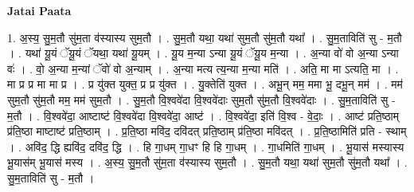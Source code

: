 \documentclass[17pt]{extarticle}
\begin{document}
\textbf{Jatai Paata} \newline

1. अ॒स्य॒ सु॒म॒तौ सु॑म॒ता व॑स्यास्य सुम॒तौ । . सु॒म॒तौ यथा॒ यथा॑ सुम॒तौ सु॑म॒तौ यथा᳚ । . सु॒म॒ताविति॑ सु - म॒तौ । . यथा॑ यू॒यं ॅयू॒यं ॅयथा॒ यथा॑ यू॒यम् । . यू॒य म॒न्या ऽन्या यू॒यं ॅयू॒य म॒न्या । . अ॒न्या वो॑ वो अ॒न्या ऽन्या वः॑ । . वो॒ अ॒न्या म॒न्यां ॅवो॑ वो अ॒न्याम् । . अ॒न्या मत्य त्य॒न्या म॒न्या मति॑ । . अति॒ मा मा ऽत्यति॒ मा । . मा प्र प्र मा मा प्र । . प्र यु॑क्त युक्त॒ प्र प्र यु॑क्त । . यु॒क्तेति॑ युक्त । . अभू॒न् मम॒ ममा भू॒ दभू॒न् मम॑ । . मम॑ सुम॒तौ सु॑म॒तौ मम॒ मम॑ सुम॒तौ । . सु॒म॒तौ वि॒श्ववे॑दा वि॒श्ववे॑दाः सुम॒तौ सु॑म॒तौ वि॒श्ववे॑दाः । . सु॒म॒ताविति॑ सु - म॒तौ । . वि॒श्ववे॑दा॒ आष्टाष्ट॑ वि॒श्ववे॑दा वि॒श्ववे॑दा॒ आष्ट॑ । . वि॒श्ववे॑दा॒ इति॑ वि॒श्व - वे॒दाः॒ । . आष्ट॑ प्रति॒ष्ठाम् प्र॑ति॒ष्ठा माष्टाष्ट॑ प्रति॒ष्ठाम् । . प्र॒ति॒ष्ठा मवि॑द॒ दवि॑दत् प्रति॒ष्ठाम् प्र॑ति॒ष्ठा मवि॑दत् । . प्र॒ति॒ष्ठामिति॑ प्रति - स्थाम् । . अवि॑द॒ द्धि ह्यवि॑द॒ दवि॑द॒ द्धि । . हि गा॒धम् गा॒धꣳ हि हि गा॒धम् । . गा॒धमिति॑ गा॒धम् । . भू॒यास॑ मस्यास्य भू॒यास॑म् भू॒यास॑ मस्य । . अ॒स्य॒ सु॒म॒तौ सु॑म॒ता व॑स्यास्य सुम॒तौ । . सु॒म॒तौ यथा॒ यथा॑ सुम॒तौ सु॑म॒तौ यथा᳚ । . सु॒म॒ताविति॑ सु - म॒तौ । \newline
\end{document}
